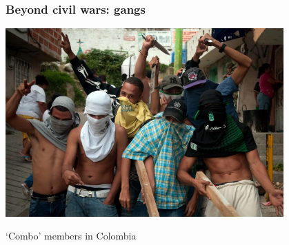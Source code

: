 \documentclass[aspectratio=43]{beamer}
\begin{document}
%
%
%
%
%

\begin{frame}
\frametitle{Beyond civil wars: gangs}
\centering


\includegraphics[width = 0.8\textwidth]{img/combo}

\vspace{15pt}

`Combo' members in Colombia

\end{frame}

%
%
%
%
%

%
%
%
%
\end{document}
